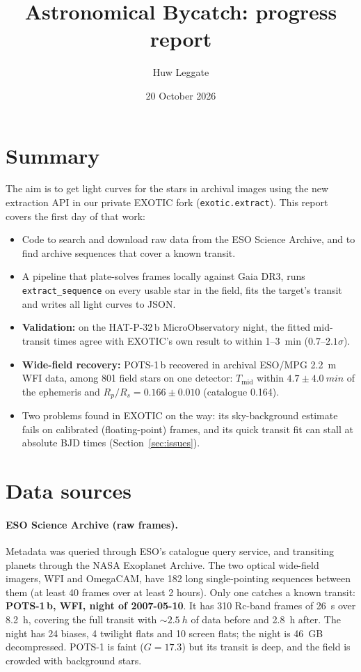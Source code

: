 \documentclass[11pt,a4paper]{article}
\title{Astronomical Bycatch: progress report}
\author{Huw Leggate}
\date{20 October 2026}
\begin{document}
\maketitle

\section{Summary}

The aim is to get light curves for the stars in archival images using the
new extraction API in our private EXOTIC fork (\texttt{exotic.extract}).
This report covers the first day of that work:

\begin{itemize}
  \item Code to search and download raw data from the ESO Science Archive,
        and to find archive sequences that cover a known transit.
  \item A pipeline that plate-solves frames locally against Gaia DR3, runs
        \texttt{extract\_sequence} on every usable star in the field, fits
        the target's transit and writes all light curves to JSON.
  \item \textbf{Validation:} on the HAT-P-32\,b MicroObservatory night, the
        fitted mid-transit times agree with EXOTIC's own result to within
        1--\SI{3}{min} ($0.7$--$2.1\sigma$).
  \item \textbf{Wide-field recovery:} POTS-1\,b recovered in archival ESO/MPG
        \SI{2.2}{m} WFI data, among 801 field stars on one detector:
        $T_\mathrm{mid}$ within $4.7\pm\SI{4.0}{min}$ of the ephemeris and
        $R_p/R_s=0.166\pm0.010$ (catalogue 0.164).
  \item Two problems found in EXOTIC on the way: its sky-background
        estimate fails on calibrated (floating-point) frames, and its quick
        transit fit can stall at absolute BJD times (Section~\ref{sec:issues}).
\end{itemize}

\section{Data sources}

\paragraph{ESO Science Archive (raw frames).}
Metadata was queried through ESO's catalogue query service, and transiting
planets through the NASA Exoplanet Archive. The two optical wide-field
imagers, WFI and OmegaCAM, have 182 long single-pointing sequences between
them (at least 40 frames over at least 2 hours). Only one catches a known
transit: \textbf{POTS-1\,b, WFI, night of 2007-05-10}. It has 310 Rc-band
frames of \SI{26}{s} over \SI{8.2}{h}, covering the full transit with
${\sim}\SI{2.5}{h}$ of data before and \SI{2.8}{h} after. The night has 24
biases, 4 twilight flats and 10 screen flats; the night is \SI{46}{GB}
decompressed. POTS-1 is faint ($G=17.3$) but its transit is deep, and the
field is crowded with background stars.
\end{document}
